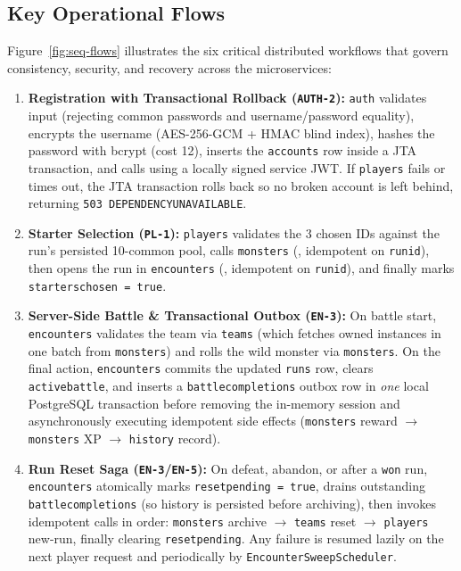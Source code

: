 \documentclass[10.5pt,a4paper]{article}
\DeclareRobustCommand{\code}[1]{\begingroup\def\_{\textunderscore\allowbreak}\texttt{#1}\endgroup}
\begin{document}
\subsection{Key Operational Flows}

Figure~\ref{fig:seq-flows} illustrates the six critical distributed workflows that govern consistency, security, and recovery across the microservices:

\begin{enumerate}
  \item \textbf{Registration with Transactional Rollback (\code{AUTH-2}):} \code{auth} validates input (rejecting common passwords and username/password equality), encrypts the username (AES-256-GCM + HMAC blind index), hashes the password with bcrypt (cost 12), inserts the \code{accounts} row inside a JTA transaction, and calls  using a locally signed service JWT. If \code{players} fails or times out, the JTA transaction rolls back so no broken account is left behind, returning \code{503 DEPENDENCY\_UNAVAILABLE}.
  \item \textbf{Starter Selection (\code{PL-1}):} \code{players} validates the 3 chosen IDs against the run's persisted 10-common pool, calls \code{monsters} (, idempotent on \code{run\_id}), then opens the run in \code{encounters} (, idempotent on \code{run\_id}), and finally marks \code{starters\_chosen = true}.
  \item \textbf{Server-Side Battle \& Transactional Outbox (\code{EN-3}):} On battle start, \code{encounters} validates the team via \code{teams} (which fetches owned instances in one batch from \code{monsters}) and rolls the wild monster via \code{monsters}. On the final action, \code{encounters} commits the updated \code{runs} row, clears \code{active\_battle\_*}, and inserts a \code{battle\_completions} outbox row in \emph{one} local PostgreSQL transaction before removing the in-memory session and asynchronously executing idempotent side effects (\code{monsters} reward $\to$ \code{monsters} XP $\to$ \code{history} record).
  \item \textbf{Run Reset Saga (\code{EN-3}/\code{EN-5}):} On defeat, abandon, or  after a \code{won} run, \code{encounters} atomically marks \code{reset\_pending = true}, drains outstanding \code{battle\_completions} (so history is persisted before archiving), then invokes idempotent calls in order: \code{monsters} archive $\to$ \code{teams} reset $\to$ \code{players} new-run, finally clearing \code{reset\_pending}. Any failure is resumed lazily on the next player request and periodically by \code{EncounterSweepScheduler}.

\end{enumerate}
\end{document}
